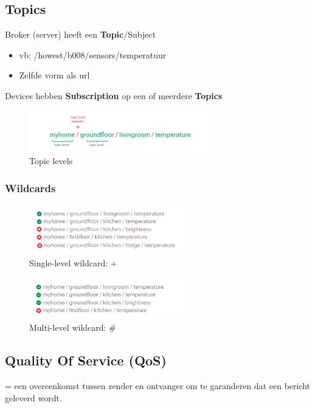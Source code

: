 \documentclass{article}
\newcommand{\bold}[1]{\textbf{#1}}
\begin{document}
\subsection{Topics}

Broker (server) heeft een \bold{Topic}/Subject
\begin{itemize}
    \item vb: /howest/b008/sensors/temperatuur
    \item Zelfde vorm als url
\end{itemize}

Devices hebben \bold{Subscription} op een of meerdere \bold{Topics}

\begin{figure}[H]
    \centering
    \includegraphics[width=0.7\textwidth]{mqtt-topics.png}
    \caption{Topic levels}
\end{figure}

\subsubsection{Wildcards}



\begin{figure}[H]
    \centering
    \includegraphics[width=0.6\textwidth]{mqtt-wildcards.png}
    \caption{Single-level wildcard: +}
\end{figure}


\begin{figure}[H]
    \centering
    \includegraphics[width=0.6\textwidth]{mqtt-wildcards2.png}
    \caption{Multi-level wildcard: \#}
\end{figure}

\subsection{Quality Of Service (QoS)}
= een overeenkomst tussen zender en ontvanger om te garanderen dat een bericht geleverd wordt.
\end{document}

